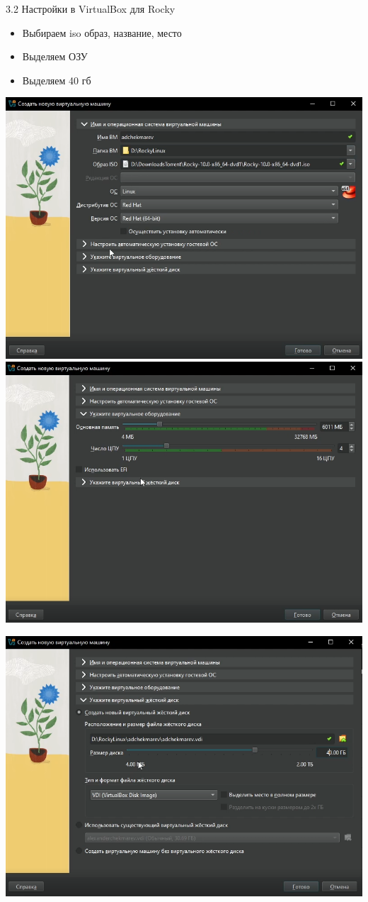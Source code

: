 \documentclass[
  ignorenonframetext,
  aspectratio=169,
  russian,
]{beamer}
\providecommand{\tightlist}{%
  \setlength{\itemsep}{0pt}\setlength{\parskip}{0pt}}
\begin{document}
\begin{frame}{3.2 Настройки в VirtualBox для Rocky}
\label{ux43dux430ux441ux442ux440ux43eux439ux43aux438-ux432-virtualbox-ux434ux43bux44f-rocky}
\begin{itemize}
\tightlist
\item
  Выбираем iso образ, название, место
\item
  Выделяем ОЗУ
\item
  Выделяем 40 гб
\end{itemize}

\includegraphics[width=0.35\linewidth,height=\textheight,keepaspectratio]{image/Рис 1.1.png}
\includegraphics[width=0.35\linewidth,height=\textheight,keepaspectratio]{image/Рис 1.2.png}

\includegraphics[width=0.35\linewidth,height=\textheight,keepaspectratio]{image/Рис 1.3.png}
\end{frame}
\end{document}
